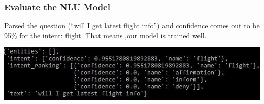  \begin{frame}[fragile]\frametitle{Evaluate the NLU Model}
Parsed the question (``will I get latest flight info'') and confidence comes out to be 95\% for the intent: flight. That means ,our model is trained well.

\begin{center}
\includegraphics[width=\linewidth,keepaspectratio]{images/mmt4}
\end{center}

\end{frame}


